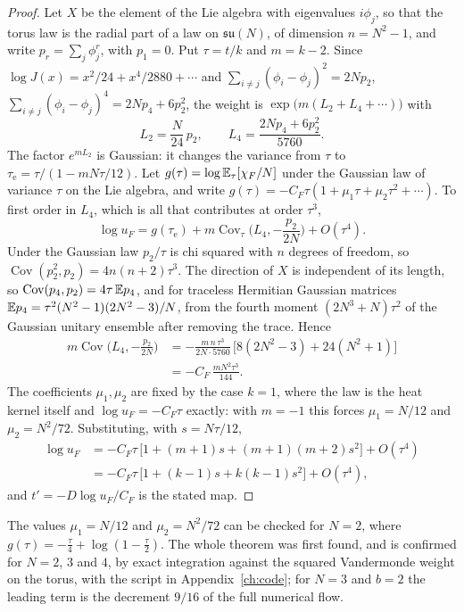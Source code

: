 \begin{proof}
Let $X$ be the element of the Lie algebra with eigenvalues $i\phi_j$, so that the torus law is the radial part of a law on $\mathfrak{su}(N)$, of dimension $n=N^2-1$, and write $p_r=\sum_j\phi_j^r$, with $p_1=0$. Put $\tau=t/k$ and $m=k-2$. Since $\log J(x)=x^2/24+x^4/2880+\cdots$ and $\sum_{i\ne j}(\phi_i-\phi_j)^2=2Np_2$, $\sum_{i\ne j}(\phi_i-\phi_j)^4=2Np_4+6p_2^2$, the weight is $\exp\big(m(L_2+L_4+\cdots)\big)$ with
\[
L_2=\frac{N}{24}\,p_2,\qquad L_4=\frac{2Np_4+6p_2^2}{5760}.
\]
The factor $e^{mL_2}$ is Gaussian: it changes the variance from $\tau$ to $\tau_{\mathrm e}=\tau/(1-mN\tau/12)$. Let $g(\tau)=\log\mathbb{E}_\tau[\chi_F/N]$ under the Gaussian law of variance $\tau$ on the Lie algebra, and write $g(\tau)=-C_F\tau(1+\mu_1\tau+\mu_2\tau^2+\cdots)$. To first order in $L_4$, which is all that contributes at order $\tau^3$,
\[
\log u_F=g(\tau_{\mathrm e})+m\operatorname{Cov}_\tau\Big(L_4,-\frac{p_2}{2N}\Big)+O(\tau^4).
\]
Under the Gaussian law $p_2/\tau$ is chi squared with $n$ degrees of freedom, so $\operatorname{Cov}(p_2^2,p_2)=4n(n+2)\tau^3$. The direction of $X$ is independent of its length, so $\operatorname{Cov}(p_4,p_2)=4\tau\,\mathbb{E} p_4$, and for traceless Hermitian Gaussian matrices $\mathbb{E} p_4=\tau^2(N^2-1)(2N^2-3)/N$, from the fourth moment $(2N^3+N)\tau^2$ of the Gaussian unitary ensemble after removing the trace. Hence
\begin{align*}
m\operatorname{Cov}\Big(L_4,-\frac{p_2}{2N}\Big)&=-\frac{m\,n\,\tau^3}{2N\cdot5760}\,\big[8(2N^2-3)+24(N^2+1)\big]\\
&=-C_F\,\frac{mN^2\tau^3}{144}.
\end{align*}
The coefficients $\mu_1,\mu_2$ are fixed by the case $k=1$, where the law is the heat kernel itself and $\log u_F=-C_F\tau$ exactly: with $m=-1$ this forces $\mu_1=N/12$ and $\mu_2=N^2/72$. Substituting, with $s=N\tau/12$,
\begin{align*}
\log u_F&=-C_F\tau\,\big[1+(m+1)s+(m+1)(m+2)s^2\big]+O(\tau^4)\\
&=-C_F\tau\,\big[1+(k-1)s+k(k-1)s^2\big]+O(\tau^4),
\end{align*}
and $t'=-D\log u_F/C_F$ is the stated map.
\end{proof}

The values $\mu_1=N/12$ and $\mu_2=N^2/72$ can be checked for $N=2$, where $g(\tau)=-\frac\tau4+\log(1-\frac\tau2)$. The whole theorem was first found, and is confirmed for $N=2$, $3$ and $4$, by exact integration against the squared Vandermonde weight on the torus, with the script in Appendix~\ref{ch:code}; for $N=3$ and $b=2$ the leading term is the decrement $9/16$ of the full numerical flow.


